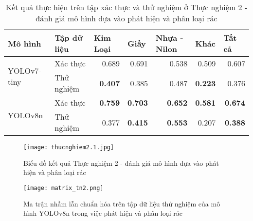 \documentclass[../the.tex]{subfiles}
\begin{document}
\begin{table}[h!]
    \centering
    \caption{Kết quả thực hiện trên tập xác thực và thử nghiệm ở Thực nghiệm 2 - đánh giá mô hình dựa vào phát hiện và phân loại rác}
    \begin{tabular}{|l|l|r|r|r|r|r|}
        \hline
        \textbf{Mô hình}             & \multicolumn{1}{l|}{\textbf{Tập dữ liệu}} & \multicolumn{1}{l|}{\textbf{Kim Loại}} & \multicolumn{1}{l|}{\textbf{Giấy}} & \multicolumn{1}{l|}{\textbf{Nhựa - Nilon}} & \multicolumn{1}{l|}{\textbf{Khác}} & \multicolumn{1}{l|}{\textbf{Tất cả}} \\ \hline
        \multirow{2}{*}{YOLOv7-tiny} & Xác thực                                  & 0.689                                  & 0.691                              & 0.538                                      & 0.509                              & 0.607                                \\ \cline{2-7}
                                     & Thử nghiệm                                & \textbf{0.407}                         & 0.385                              & 0.487                                      & \textbf{0.223}                     & 0.376                                \\ \hline
        \multirow{2}{*}{YOLOv8n}     & Xác thực                                  & \textbf{0.759}                         & \textbf{0.703}                     & \textbf{0.652}                             & \textbf{0.581}                     & \textbf{0.674}                       \\ \cline{2-7}
                                     & Thử nghiệm                                & 0.377                                  & \textbf{0.415}                     & \textbf{0.553}                             & 0.207                              & \textbf{0.388}                       \\ \hline
    \end{tabular}
    \label{tab:thucnghiem2.1}
\end{table}


\begin{figure}[H]
    \centering
    \texttt{[image: thucnghiem2.1.jpg]}
    \caption{Biểu đồ kết quả Thực nghiệm 2 - đánh giá mô hình dựa vào phát hiện và phân loại rác}
    \label{fig:thucnghiem2}
\end{figure}

\begin{figure}[H]
    \centering
    \texttt{[image: matrix\_tn2.png]}
    \caption{Ma trận nhầm lẫn chuẩn hóa trên tập dữ liệu thử nghiệm của mô hình YOLOv8n trong việc phát hiện và phân loại rác}
    \label{fig:thucnghiem2.1}
\end{figure}
\end{document}
